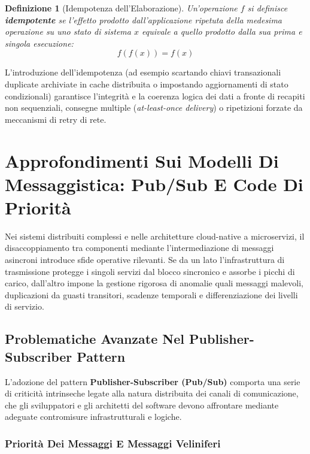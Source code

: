 \documentclass[11pt, a4paper]{article}
\newtheorem{theorem}{Definizione}
\begin{document}
\begin{theorem}[Idempotenza dell'Elaborazione]
Un'operazione $f$ si definisce \textbf{idempotente} se l'effetto prodotto dall'applicazione ripetuta della medesima operazione su uno stato di sistema $x$ equivale a quello prodotto dalla sua prima e singola esecuzione:
\[
\boxed{f(f(x)) = f(x)}
\]
\end{theorem}

L'introduzione dell'idempotenza (ad esempio scartando chiavi transazionali duplicate archiviate in cache distribuita o impostando aggiornamenti di stato condizionali) garantisce l'integrità e la coerenza logica dei dati a fronte di recapiti non sequenziali, consegne multiple (\emph{at-least-once delivery}) o ripetizioni forzate da meccanismi di retry di rete.


\section{Approfondimenti Sui Modelli Di Messaggistica: Pub/Sub E Code Di Priorità}

Nei sistemi distribuiti complessi e nelle architetture cloud-native a microservizi, il disaccoppiamento tra componenti mediante l'intermediazione di messaggi asincroni introduce sfide operative rilevanti. Se da un lato l'infrastruttura di trasmissione protegge i singoli servizi dal blocco sincronico e assorbe i picchi di carico, dall'altro impone la gestione rigorosa di anomalie quali messaggi malevoli, duplicazioni da guasti transitori, scadenze temporali e differenziazione dei livelli di servizio.

\subsection{Problematiche Avanzate Nel Publisher-Subscriber Pattern}

L'adozione del pattern \textbf{Publisher-Subscriber (Pub/Sub)} comporta una serie di criticità intrinseche legate alla natura distribuita dei canali di comunicazione, che gli sviluppatori e gli architetti del software devono affrontare mediante adeguate contromisure infrastrutturali e logiche.

\subsubsection{Priorità Dei Messaggi E Messaggi Veliniferi}
\end{document}
